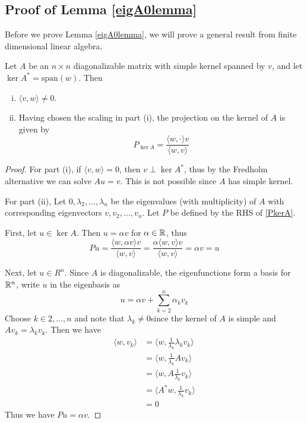 \documentclass[thesis.tex]{subfiles}
\begin{document}
\subsection{Proof of Lemma \ref{eigA0lemma}}

Before we prove Lemma \ref{eigA0lemma}, we will prove a general result from finite dimensional linear algebra.

\begin{lemma}\label{kernelprojlemma}
Let $A$ be an $n \times n$ diagonalizable matrix with simple kernel spanned by $v$, and let $\ker A^* = \text{span}(w)$. Then 
\begin{enumerate}[(i)]
\item $\langle v, w \rangle \neq 0$.
\item Having chosen the scaling in part (i), the projection on the kernel of $A$ is given by
\begin{equation}\label{PkerA}
P_{\ker A} = \frac{ \langle w, \cdot \rangle v }{\langle w, v \rangle }
\end{equation}
\end{enumerate}
\begin{proof}
For part (i), if $\langle v, w \rangle = 0$, then $v \perp \ker A^*$, thus by the Fredholm alternative we can solve $A u = v$. This is not possible since $A$ has simple kernel.

For part (ii), Let $0, \lambda_2, \dots, \lambda_n$ be the eigenvalues (with multiplicity) of $A$ with corresponding eigenvectors $v, v_2, \dots, v_n$. Let $P$ be defined by the RHS of \eqref{PkerA}.

First, let $u \in \ker A$. Then $u = \alpha v$ for $\alpha \in \mathbb{R}$, thus 
\[
P u = \frac{ \langle w, \alpha v \rangle v }{\langle w, v \rangle } = \frac{ \alpha \langle w, v \rangle v}{\langle w, v \rangle } = \alpha v = u
\]

Next, let $u \in R^n$. Since $A$ is diagonalizable, the eigenfunctions form a basis for $\mathbb{R}^n$, write $u$ in the eigenbasis as
\[
u = \alpha v + \sum_{k=2}^n \alpha_k v_k
\]
Choose $k \in 2, \dots, n$ and note that $\lambda_k \neq 0$since the kernel of $A$ is simple and $A v_k = \lambda_k v_k$. Then we have
\begin{align*}
\langle w, v_k \rangle &= \langle w, \frac{1}{\lambda_k}\lambda_k v_k \rangle \\
&= \langle w, \frac{1}{\lambda_k} A v_k \rangle \\
&= \langle w, A \frac{1}{\lambda_k} v_k \rangle \\
&= \langle A^* w, \frac{1}{\lambda_k} v_k \rangle \\
&= 0
\end{align*}
Thus we have $P u = \alpha v$.
\end{proof}
\end{lemma}
\end{document}
